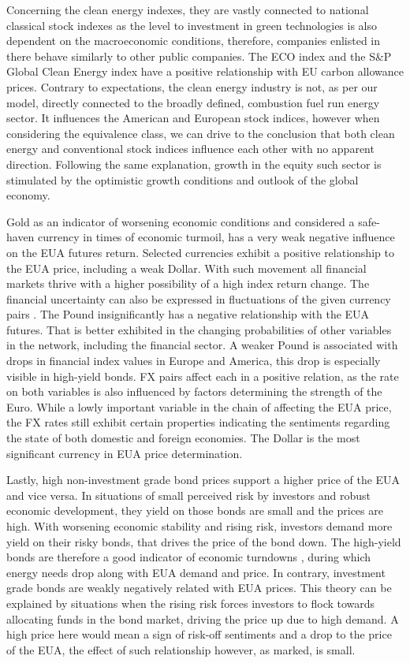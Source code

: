 \documentclass[12pt, letterpaper]{article}
\begin{document}
Concerning the clean energy indexes, they are vastly connected to national classical stock indexes as the level to investment in green technologies is also dependent on the macroeconomic conditions, therefore, companies enlisted in there behave similarly to other public companies. The ECO index and the S\&P Global Clean Energy index have a positive relationship with EU carbon allowance prices. Contrary to expectations, the clean energy industry is not, as per our model, directly connected to the broadly defined, combustion fuel run energy sector. It influences the American and European stock indices, however when considering the equivalence class, we can drive to the conclusion that both clean energy and conventional stock indices influence each other with no apparent direction. Following the same explanation, growth in the equity such sector is stimulated by the optimistic growth conditions and outlook of the global economy.

Gold as an indicator of worsening economic conditions and considered a safe-haven currency in times of economic turmoil, has a very weak negative influence on the EUA futures return. Selected currencies exhibit a positive relationship to the EUA price, including a weak Dollar. With such movement all financial markets thrive with a higher possibility of a high index return change. The financial uncertainty can also be expressed in fluctuations of the given currency pairs \parencite{salvagnin2024}. The Pound insignificantly has a negative relationship with the EUA futures. That is better exhibited in the changing probabilities of other variables in the network, including the financial sector. A weaker Pound is associated with drops in financial index values in Europe and America, this drop is especially visible in high-yield bonds. FX pairs affect each in a positive relation, as the rate on both variables is also influenced by factors determining the strength of the Euro. While a lowly important variable in the chain of affecting the EUA price, the FX rates still exhibit certain properties indicating the sentiments regarding the state of both domestic and foreign economies. The Dollar is the most significant currency in EUA price determination.

Lastly, high non-investment grade bond prices support a higher price of the EUA and vice versa. In situations of small perceived risk by investors and robust economic development, they yield on those bonds are small and the prices are high. With worsening economic stability and rising risk, investors demand more yield on their risky bonds, that drives the price of the bond down. The high-yield bonds are therefore a good indicator of economic turndowns \parencite{salvagnin2024, tan2017}, during which energy needs drop along with EUA demand and price. In contrary, investment grade bonds are weakly negatively related with EUA prices. This theory can be explained by situations when the rising risk forces investors to flock towards allocating funds in the bond market, driving the price up due to high demand. A high price here would mean a sign of risk-off sentiments and a drop to the price of the EUA, the effect of such relationship however, as marked, is small.
\end{document}

